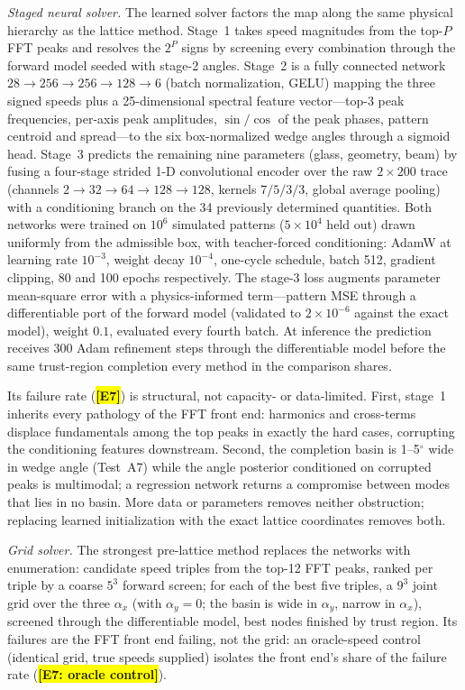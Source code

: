 \documentclass[twocolumn,preprintnumbers,amsmath,amssymb,pra,floatfix]{revtex4-2}
\newcommand{\PH}[1]{\colorbox{yellow}{\textbf{\small [#1]}}}
\begin{document}
\emph{Staged neural solver.}  The learned solver factors the map along
the same physical hierarchy as the lattice method.  Stage~1 takes
speed magnitudes from the top-$P$ FFT peaks and resolves the $2^{P}$
signs by screening every combination through the forward model seeded
with stage-2 angles.  Stage~2 is a fully connected network
$28\!\to\!256\!\to\!256\!\to\!128\!\to\!6$ (batch normalization, GELU)
mapping the three signed speeds plus a 25-dimensional spectral feature
vector---top-3 peak frequencies, per-axis peak amplitudes,
$\sin/\cos$ of the peak phases, pattern centroid and spread---to the
six box-normalized wedge angles through a sigmoid head.  Stage~3
predicts the remaining nine parameters (glass, geometry, beam) by
fusing a four-stage strided 1-D convolutional encoder over the raw
$2\times200$ trace (channels $2\!\to\!32\!\to\!64\!\to\!128\!\to\!128$,
kernels $7/5/3/3$, global average pooling) with a conditioning branch
on the 34 previously determined quantities.  Both networks were
trained on $10^{6}$ simulated patterns ($5\times10^{4}$ held out)
drawn uniformly from the admissible box, with teacher-forced
conditioning: AdamW at learning rate $10^{-3}$, weight decay
$10^{-4}$, one-cycle schedule, batch 512, gradient clipping, 80 and
100 epochs respectively.  The stage-3 loss augments parameter
mean-square error with a physics-informed term---pattern MSE through
a differentiable port of the forward model (validated to
$2\times10^{-6}$ against the exact model), weight $0.1$, evaluated
every fourth batch.  At inference the prediction receives 300 Adam
refinement steps through the differentiable model before the same
trust-region completion every method in the comparison shares.

Its failure rate (\PH{E7}) is structural, not capacity- or
data-limited.  First, stage~1 inherits every pathology of the FFT
front end: harmonics and
cross-terms displace fundamentals among the top peaks in exactly the
hard cases, corrupting the conditioning features downstream.  Second,
the completion basin is 1--5$^{\circ}$ wide in wedge angle (Test~A7)
while the angle posterior conditioned on corrupted peaks is
multimodal; a regression network returns a compromise between modes
that lies in no basin.  More data or parameters removes neither
obstruction; replacing learned initialization with the exact lattice
coordinates removes both.

\emph{Grid solver.}  The strongest pre-lattice method replaces the
networks with enumeration: candidate speed triples from the top-12
FFT peaks, ranked per triple by a coarse $5^{3}$ forward screen; for
each of the best five triples, a $9^{3}$ joint grid over the three
$\alpha_x$ (with $\alpha_y=0$; the basin is wide in $\alpha_y$,
narrow in $\alpha_x$), screened through the differentiable model,
best nodes finished by trust region.  Its failures are the FFT front
end failing, not the grid: an oracle-speed control (identical grid,
true speeds supplied) isolates the front end's share of the failure
rate (\PH{E7: oracle control}).
\end{document}
